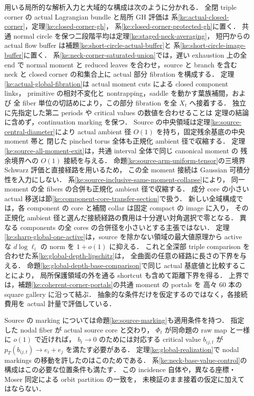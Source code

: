 用いる局所的な解析入力と大域的な構成は次のように分かれる．
全閉 triple corner の actual Lagrangian bundle と局所 GH 評価は
系\ref{ke:actual-closed-corner}，定理\ref{ke:closed-corner-gh}，
系\ref{ke:closed-corner-protected-gh}に置く．
共通 normal circle を保つ二段階平均は定理\ref{ke:staged-neck-averaging}，
短円からの actual flow buffer は補題\ref{ke:short-circle-actual-buffer}と
系\ref{ke:short-circle-image-buffer}に置く．
系\ref{ke:neck-corner-saturated-union}では，遅い exhaustion 上の全 end で
normal moment と reduced leaves を合わせ，source と branch を含む neck と
closed corner の和集合上に actual 部分 fibration を構成する．
定理\ref{ke:actual-global-fibration}は actual moment cuts による closed component links，
primitive の相対不変化と nontrapping，saddle を動かす葉族補間，および
全 fiber 単位の切詰めにより，この部分 fibration を全 $X_t$ へ接着する．
独立に先指定した第二 periods や critical values の数値を合わせることは
定理の結論に含めず，continuation marking を保つ．
Source の中央領域は定理\ref{ke:source-central-diameter}により
actual ambient 径 $O(1)$ を持ち，固定残余基底の中央 moment 帯と
閉じた pinched torus 全体も正規化 ambient 径で収縮する．
定理\ref{ke:source-all-moment-exit}は，共通 interval 全体で同じ canonical moment の
残余境界への $O(1)$ 接続を与える．
命題\ref{ke:source-arm-uniform-tensor}の三境界 Schwarz 評価と直接経路を用いるため，
この全 moment 接続は Gaussian 可積分性を入力にしない．
系\ref{ke:source-inclusive-same-moment-collapse}により，
同一 moment の全 fibers の合併も正規化 ambient 径で収縮する．
成分 core の小さい actual 移送は節\ref{ke:component-core-transfer-section}で扱う．
新しい全域構成では，各 component の core と補間 collar は固定 compact の image に入り，
その正規化 ambient 径と選んだ接続経路の費用は十分遅い対角選択で零となる．
異なる components の全 cores の合併径を小さいとする主張ではない．
定理\ref{ke:sharp-global-one-active}は，source を除かない領域の最大値原理から
active な $d\log\ell_i$ の norm を $1+o(1)$ に抑える．
これと全深部 triple comparison を合わせた系\ref{ke:global-depth-lipschitz}は，
全曲面の任意の経路に長さの下界を与える．
命題\ref{ke:global-depth-base-comparison}で同じ actual 基底値と比較することにより，
局所保護領域の外を通る shortcut も含めて距離下界を得る．
上界では，補題\ref{ke:coherent-corner-portals}の共通 moment の portals を
高々 $60$ 本の square gallery に沿って結ぶ．
抽象的な条件だけを仮定するのではなく，各接続費用を actual 計量で評価している．

Source の marking については命題\ref{ke:source-marking}も適用条件を持つ．
指定した nodal fiber が actual source core と交わり，
$\Phi_t$ が同命題の raw map と一様に $o(1)$ で近ければ，
$b_t\to0$ のためには対応する critical value $b_{ij,t}$ が
$p_T(b_{ij,t})\to e_i+e_j$ を満たす必要がある．
定理\ref{ke:global-realization}で nodal markings の移動を許したのはこのためである．
系\ref{ke:neck-base-value-control}の構成はこの必要な位置条件も満たす．
この incidence 自体や，異なる座標・Moser 同定による orbit partition の一致を，
未検証のまま接着の仮定に加えてはならない．

